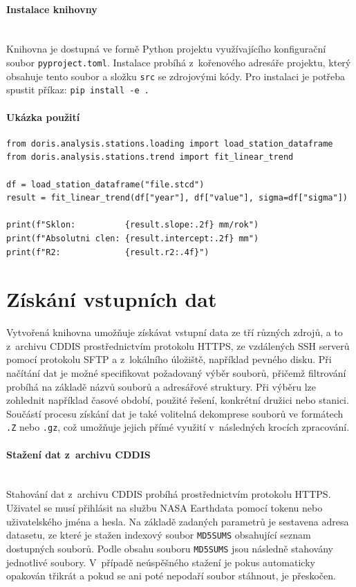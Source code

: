 \paragraph{Instalace knihovny}\leavevmode\\
Knihovna je dostupná ve formě Python projektu využívajícího konfigurační soubor \texttt{pyproject.toml}. Instalace probíhá z~kořenového adresáře projektu, který obsahuje tento soubor a složku \texttt{src} se zdrojovými kódy. Pro instalaci je potřeba spustit příkaz: \texttt{pip install -e .}


\paragraph{Ukázka použití}
\begin{verbatim}
from doris.analysis.stations.loading import load_station_dataframe
from doris.analysis.stations.trend import fit_linear_trend

df = load_station_dataframe("file.stcd")
result = fit_linear_trend(df["year"], df["value"], sigma=df["sigma"])

print(f"Sklon:          {result.slope:.2f} mm/rok")
print(f"Absolutni clen: {result.intercept:.2f} mm")
print(f"R2:             {result.r2:.4f}")
\end{verbatim}

\section{Získání vstupních dat}

Vytvořená knihovna umožňuje získávat vstupní data ze tří různých zdrojů, a to z~archivu CDDIS prostřednictvím protokolu HTTPS, ze vzdálených SSH serverů pomocí protokolu SFTP a z~lokálního úložiště, například pevného disku. Při načítání dat je možné specifikovat požadovaný výběr souborů, přičemž filtrování probíhá na základě názvů souborů a adresářové struktury. Při výběru lze zohlednit například časové období, použité řešení, konkrétní družici nebo stanici. Součástí procesu získání dat je také volitelná dekomprese souborů ve formátech \texttt{.Z} nebo \texttt{.gz}, což umožňuje jejich přímé využití v~následných krocích zpracování.

\paragraph{Stažení dat z~archivu CDDIS}\leavevmode\\
Stahování dat z~archivu CDDIS probíhá prostřednictvím protokolu HTTPS. Uživatel se musí přihlásit na službu NASA Earthdata pomocí tokenu nebo uživatelského jména a hesla. Na základě zadaných parametrů je sestavena adresa datasetu, ze které je stažen indexový soubor \texttt{MD5SUMS} obsahující seznam dostupných souborů. Podle obsahu souboru \texttt{MD5SUMS} jsou následně stahovány jednotlivé soubory. V~případě neúspěšného stažení je pokus automaticky opakován třikrát a pokud se ani poté nepodaří soubor stáhnout, je přeskočen.

